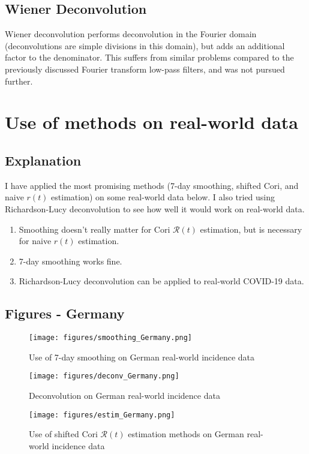 \documentclass{article}
\newcommand{\nR}{\mathscr{R}}
\newcommand{\nr}{r}
\begin{document}
\subsection{Wiener Deconvolution}
Wiener deconvolution performs deconvolution in the Fourier domain (deconvolutions are simple divisions in this domain), but adds an additional factor to the denominator. This suffers from similar problems compared to the previously discussed Fourier transform low-pass filters, and was not pursued further.

\section{Use of methods on real-world data}
\subsection{Explanation}
I have applied the most promising methods (7-day smoothing, shifted Cori, and naive $\nr(t)$ estimation) on some real-world data below. I also tried using Richardson-Lucy deconvolution to see how well it would work on real-world data. 

\begin{enumerate}
    \item Smoothing doesn't really matter for Cori $\nR(t)$ estimation, but is necessary for naive $\nr(t)$ estimation.
    \item 7-day smoothing works fine. 
    \item Richardson-Lucy deconvolution can be applied to real-world COVID-19 data.
\end{enumerate}


\subsection{Figures - Germany}
\begin{figure}[h!]
    \centering
    \texttt{[image: figures/smoothing\_Germany.png]}
    \caption{Use of 7-day smoothing on German real-world incidence data}
    \label{fig:my_label}
\end{figure}

\begin{figure}
    \centering
    \texttt{[image: figures/deconv\_Germany.png]}
    \caption{Deconvolution on German real-world incidence data}
    \label{fig:my_label}
\end{figure}

\begin{figure}[h!]
    \centering
    \texttt{[image: figures/estim\_Germany.png]}
    \caption{Use of shifted Cori $\nR(t)$ estimation methods on German real-world incidence data}
    \label{fig:my_label}
\end{figure}
\end{document}
